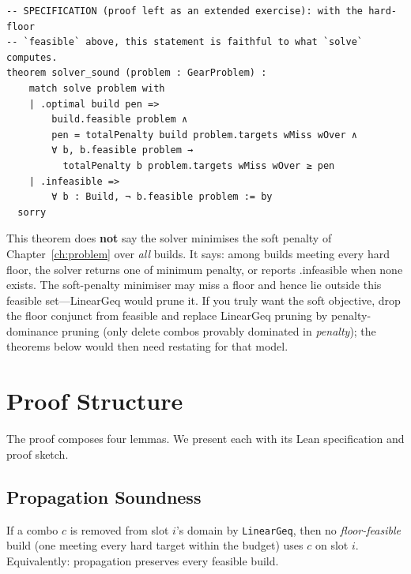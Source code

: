 \documentclass[11pt, a4paper, oneside]{book}
\newcommand{\li}[1]{{\ttfamily\small\color{deepblue}#1}}
\begin{document}
\begin{thmbox}[title={Solver Soundness (specification)}]
\begin{verbatim}
-- SPECIFICATION (proof left as an extended exercise): with the hard-floor
-- `feasible` above, this statement is faithful to what `solve` computes.
theorem solver_sound (problem : GearProblem) :
    match solve problem with
    | .optimal build pen =>
        build.feasible problem ∧
        pen = totalPenalty build problem.targets wMiss wOver ∧
        ∀ b, b.feasible problem →
          totalPenalty b problem.targets wMiss wOver ≥ pen
    | .infeasible =>
        ∀ b : Build, ¬ b.feasible problem := by
  sorry
\end{verbatim}
\end{thmbox}

\begin{warningbox}[title={Soft vs.\ hard, restated}]
This theorem does \textbf{not} say the solver minimises the soft penalty of
Chapter~\ref{ch:problem} over \emph{all} builds.  It says: among builds meeting
every hard floor, the solver returns one of minimum penalty, or reports
\li{.infeasible} when none exists.  The soft-penalty minimiser may miss a floor
and hence lie outside this feasible set---\li{LinearGeq} would prune it.  If you
truly want the soft objective, drop the floor conjunct from \li{feasible} and
replace \li{LinearGeq} pruning by penalty-dominance pruning (only delete combos
provably dominated in \emph{penalty}); the theorems below would then need
restating for that model.
\end{warningbox}

\section{Proof Structure}

The proof composes four lemmas.  We present each with its Lean specification
and proof sketch.

\subsection{Propagation Soundness}

\begin{lembox}[title={Propagation Preserves Feasible Solutions}]
If a combo $c$ is removed from slot $i$'s domain by \texttt{LinearGeq}, then no
\emph{floor-feasible} build (one meeting every hard target within the budget)
uses $c$ on slot $i$.  Equivalently: propagation preserves every feasible build.
\end{lembox}
\end{document}
